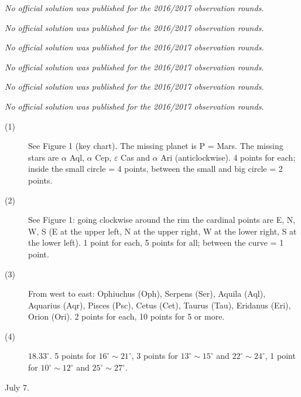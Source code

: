 \textit{No official solution was published for the 2016/2017 observation rounds.}

\textit{No official solution was published for the 2016/2017 observation rounds.}

\textit{No official solution was published for the 2016/2017 observation rounds.}

\textit{No official solution was published for the 2016/2017 observation rounds.}

\textit{No official solution was published for the 2016/2017 observation rounds.}

\textit{No official solution was published for the 2016/2017 observation rounds.}

\begin{description}
\item[(1)] See Figure 1 (key chart). The missing planet is P = Mars. The
  missing stars are $\alpha$ Aql, $\alpha$ Cep, $\varepsilon$ Cas and
  $\alpha$ Ari (anticlockwise). 4 points for each; inside the small circle
  = 4 points, between the small and big circle = 2 points.
\item[(2)] See Figure 1: going clockwise around the rim the cardinal
  points are E, N, W, S (E at the upper left, N at the upper right, W at
  the lower right, S at the lower left). 1 point for each, 5 points for
  all; between the curve = 1 point.
\item[(3)] From west to east: Ophiuchus (Oph), Serpens (Ser), Aquila (Aql),
  Aquarius (Aqr), Pisces (Psc), Cetus (Cet), Taurus (Tau), Eridanus (Eri),
  Orion (Ori). 2 points for each, 10 points for 5 or more.
\item[(4)] $18.33^\circ$. 5 points for $16^\circ \sim 21^\circ$, 3 points
  for $13^\circ \sim 15^\circ$ and $22^\circ \sim 24^\circ$, 1 point for
  $10^\circ \sim 12^\circ$ and $25^\circ \sim 27^\circ$.
\end{description}

July 7.

